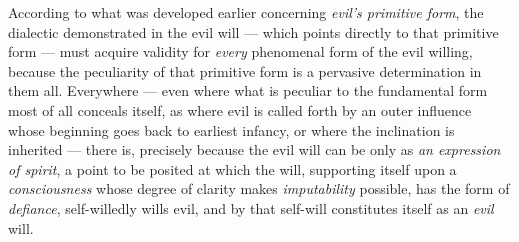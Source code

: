 \documentclass[12pt,a4paper]{book}
\begin{document}
According to what was developed earlier concerning \emph{evil's primitive form},
the dialectic demonstrated in the evil will --- which points directly to that
primitive form --- must acquire validity for \emph{every} phenomenal form of the
evil
willing, because the peculiarity of that primitive form is a pervasive
determination in them all. Everywhere --- even where what is peculiar to the
fundamental form most of all conceals itself, as where evil is called forth by
an outer influence whose beginning goes back to earliest infancy, or where the
inclination is inherited --- there is, precisely because the evil will can be
only as \emph{an expression of spirit}, a point to be posited at which the will,
supporting itself upon a \emph{consciousness} whose degree of clarity makes
\emph{imputability} possible, has the form of \emph{defiance}, self-willedly
wills evil, and by that self-will constitutes itself as an \emph{evil} will.
\end{document}
